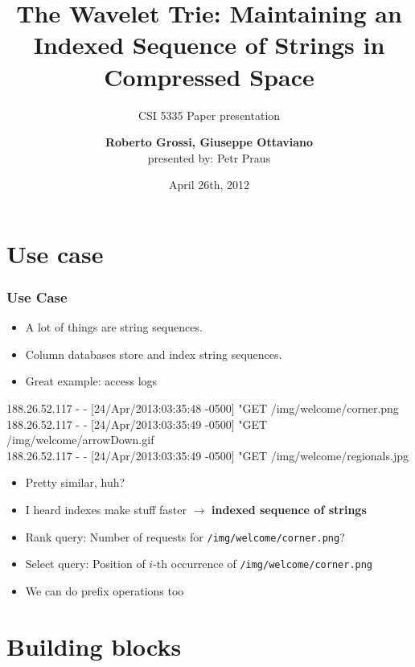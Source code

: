 \documentclass{beamer}
\title[The Wavelet Trie]{The Wavelet Trie: Maintaining an Indexed Sequence of
Strings in Compressed Space}
\subtitle{CSI 5335 Paper presentation}
\author[Roberto Grossi, Giuseppe Ottaviano]{{\bf Roberto Grossi, Giuseppe
Ottaviano}\\
presented by: Petr Praus}
\date{April 26th, 2012}
\newenvironment{changemargin}[2]{%
  \begin{list}{}{%
    \setlength{\topsep}{0pt}%
    \setlength{\leftmargin}{#1}%
    \setlength{\rightmargin}{#2}%
    \setlength{\listparindent}{\parindent}%
    \setlength{\itemindent}{\parindent}%
    \setlength{\parsep}{\parskip}%
  }%
  \item[]}{\end{list}}
\begin{document}
\begin{frame}
\titlepage
\end{frame}

\section{Use case}

\begin{frame}
\frametitle{Use Case}
\begin{itemize}
  \item A lot of things are string sequences.
  \item Column databases store and index string sequences.
  \item Great example: access logs
\end{itemize}
\vspace{10pt}
{\scriptsize
188.26.52.117 - - [24/Apr/2013:03:35:48 -0500] "GET /img/welcome/corner.png\\
188.26.52.117 - - [24/Apr/2013:03:35:49 -0500] "GET /img/welcome/arrowDown.gif\\
188.26.52.117 - - [24/Apr/2013:03:35:49 -0500] "GET /img/welcome/regionals.jpg\\
}
\vspace{10pt}
\begin{changemargin}{-15pt}{-15pt}
\begin{itemize}
  \item Pretty similar, huh?
  \item I heard indexes make stuff faster $\rightarrow$ \textbf{indexed sequence of strings}
  \item Rank query: Number of requests for \texttt{/img/welcome/corner.png}?
  \item Select query: Position of $i$-th occurrence of \texttt{/img/welcome/corner.png}
  \item We can do prefix operations too
\end{itemize}
\end{changemargin}
\end{frame}


\section{Building blocks}
\end{document}
